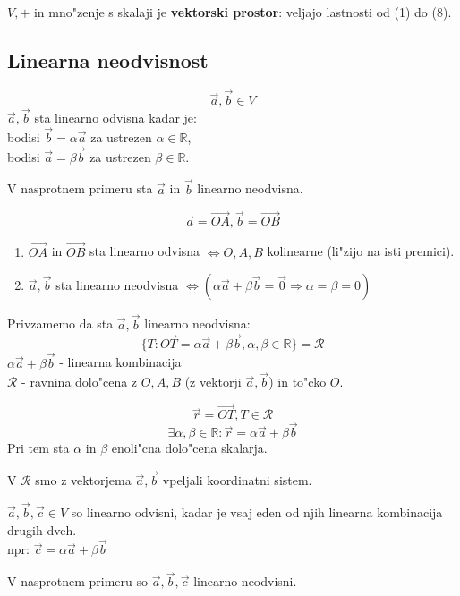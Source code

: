 \(V, +\) in mno"zenje s skalaji je \textbf{vektorski prostor}: veljajo lastnosti od (1) do (8).

\subsection{Linearna neodvisnost}
\[\vec{a}, \vec{b} \in V\]
\(\vec{a}, \vec{b}\) sta linearno odvisna kadar je:\\
\hspace*{10pt} bodisi \(\vec{b} = \alpha \vec{a}\) za ustrezen \(\alpha \in \mathbb{R}\),\\
\hspace*{10pt} bodisi \(\vec{a}  = \beta \vec{b}\) za ustrezen \(\beta \in \mathbb{R}\).

V nasprotnem primeru sta \(\vec{a}\) in \(\vec{b}\) linearno neodvisna.

\[\vec{a} = \vec{OA}, \vec{b} = \vec{OB}\]

\begin{enumerate}
	\item \(\vec{OA}\) in \(\vec{OB}\) sta linearno odvisna \(\Leftrightarrow O, A, B\) kolinearne (li"zijo na isti premici).
	\item \(\vec{a}, \vec{b}\) sta linearno neodvisna \(\Leftrightarrow (\alpha \vec{a} + \beta \vec{b} = \vec{0} \Rightarrow \alpha = \beta = 0)\)
\end{enumerate}

Privzamemo da sta \(\vec{a}, \vec{b}\) linearno neodvisna:
\[\{T: \vec{OT} = \alpha \vec{a} + \beta \vec{b}, \alpha, \beta \in \mathbb{R}\} = \mathcal{R}\]
\( \alpha \vec{a} + \beta \vec{b}\) - linearna kombinacija\\
\(\mathcal{R}\) - ravnina dolo"cena z \(O, A, B\) (z vektorji \(\vec{a}, \vec{b}\)) in to"cko \(O\).

\[\vec{r} = \vec{OT}, T \in \mathcal{R}\]
\[\exists \alpha, \beta \in \mathbb{R}: \vec{r} = \alpha \vec{a} + \beta \vec{b} \]
Pri tem sta \(\alpha\) in \(\beta\) enoli"cna dolo"cena skalarja.

V \(\mathcal{R}\) smo z vektorjema \(\vec{a}, \vec{b}\) vpeljali koordinatni sistem.

\(\vec{a}, \vec{b}, \vec{c} \in V\) so linearno odvisni, kadar je vsaj eden od njih linearna kombinacija drugih dveh.\\
npr: \(\vec{c} = \alpha \vec{a} + \beta \vec{b}\)

V nasprotnem primeru so \(\vec{a}, \vec{b}, \vec{c}\) linearno neodvisni.

